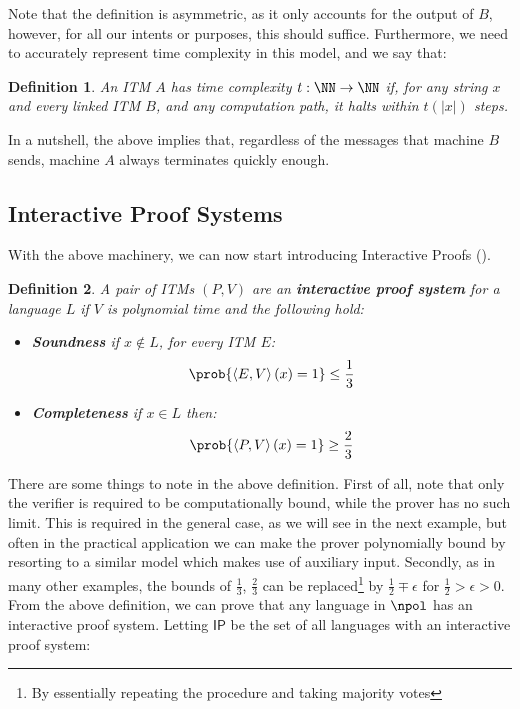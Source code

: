 \documentclass{article}
\newtheorem{definition}{Definition}
\begin{document}
Note that the definition is asymmetric, as it only accounts for the output of $B$, however, for all our intents or purposes, this should suffice.
Furthermore, we need to accurately represent time complexity in this model, and we say that:

\begin{definition}
    An ITM $A$ has time complexity $t: \NN \to \NN$ if, for any string $x$ and every linked ITM $B$, and any computation path, it halts within $t(|x|)$ steps.
\end{definition}

In a nutshell, the above implies that, regardless of the messages that machine $B$ sends, machine $A$ always terminates quickly enough.

\subsection{Interactive Proof Systems}
With the above machinery, we can now start introducing Interactive Proofs (\cite{goldwasserKnowledgeComplexityInteractive1989}).
\begin{definition}
    A pair of ITMs $(P, V)$ are an \textbf{interactive proof system} for a language $L$ if $V$ is polynomial time and the following hold:
    \begin{itemize}
        \item \textbf{Soundness} if $x \notin L$, for every ITM $E$:
              \[ \prob{\left<E,V \right>(x) = 1} \leq \frac{1}{3} \]
        \item \textbf{Completeness} if $x \in L$ then:
              \[ \prob{\left<P, V\right>(x) = 1 } \geq \frac{2}{3}\]
    \end{itemize}
\end{definition}
There are some things to note in the above definition. First of all, note that only the verifier is required to be computationally bound, while the prover has no such limit. This is required in the general case, as we will see in the next example, but often in the practical application we can make the prover polynomially bound by resorting to a similar model which makes use of auxiliary input. Secondly, as in many other examples, the bounds of $\frac{1}{3}$, $\frac{2}{3}$ can be replaced\footnote{By essentially repeating the procedure and taking majority votes} by $\frac{1}{2} \mp \epsilon$ for $\frac{1}{2} > \epsilon > 0$. From the above definition, we can prove that any language in $\npol$ has an interactive proof system. Letting $\mathsf{IP}$ be the set of all languages with an interactive proof system:
\end{document}
